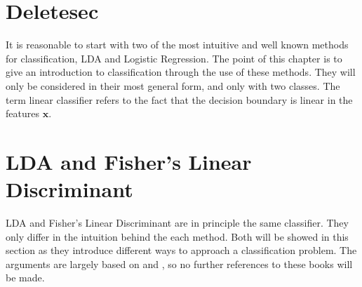\section{Deletesec}
\label{sec:Deletesec}
It is reasonable to start with two of the most intuitive and well known methods for classification, LDA and Logistic Regression. 
The point of this chapter is to give an introduction to classification through the use of these methods. They will only be considered in their most general form, and only with two classes. The term linear classifier refers to the fact that the decision boundary is linear in the features $\mathbf{x}$.
%
\section{LDA and Fisher's Linear Discriminant}
\label{sec:LDA and Fisher's Linear Discriminant}
LDA and Fisher's Linear Discriminant are in principle the same classifier. They only differ in the intuition behind the each method. Both will be showed in this section as they introduce different ways to approach a classification problem. The arguments are largely based on \cite{bishop} and \cite{modstat}, so no further references to these books will be made. 

